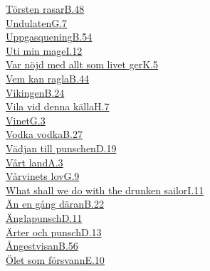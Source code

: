   \hyperref[torstenrasar]{Törsten rasar}\dotfill\hyperref[torstenrasar]{B.48}\\
  \hyperref[undulaten]{Undulaten}\dotfill\hyperref[undulaten]{G.7}\\
  \hyperref[uppgasquening]{Uppgasquening}\dotfill\hyperref[uppgasquening]{B.54}\\
  \hyperref[utiminmage]{Uti min mage}\dotfill\hyperref[utiminmage]{I.12}\\
  \hyperref[varnojd]{Var nöjd med allt som livet ger}\dotfill\hyperref[varnojd]{K.5}\\
  \hyperref[vemkanragla]{Vem kan ragla}\dotfill\hyperref[vemkanragla]{B.44}\\
  \hyperref[vikingen]{Vikingen}\dotfill\hyperref[vikingen]{B.24}\\
  \hyperref[vilaviddennakalla]{Vila vid denna källa}\dotfill\hyperref[vilaviddennakalla]{H.7}\\
  \hyperref[vinet]{Vinet}\dotfill\hyperref[vinet]{G.3}\\
  \hyperref[vodkavodka]{Vodka vodka}\dotfill\hyperref[vodkavodka]{B.27}\\
  \hyperref[vadjantillpunschen]{Vädjan till punschen}\dotfill\hyperref[vadjantillpunschen]{D.19}\\
  \hyperref[vartland]{Vårt land}\dotfill\hyperref[vartland]{A.3}\\
  \hyperref[varvinetslov]{Vårvinets lov}\dotfill\hyperref[varvinetslov]{G.9}\\
  \hyperref[drunkensailor]{What shall we do with the drunken sailor}\dotfill\hyperref[drunkensailor]{I.11}\\
  \hyperref[anengang]{Än en gång däran}\dotfill\hyperref[anengang]{B.22}\\
  \hyperref[anglapunsch]{Änglapunsch}\dotfill\hyperref[anglapunsch]{D.11}\\
  \hyperref[arterochpunsch]{Ärter och punsch}\dotfill\hyperref[arterochpunsch]{D.13}\\
  \hyperref[angestvisan]{Ångestvisan}\dotfill\hyperref[angestvisan]{B.56}\\
  \hyperref[ohletsomforsvann]{Ölet som försvann}\dotfill\hyperref[ohletsomforsvann]{E.10}\\
